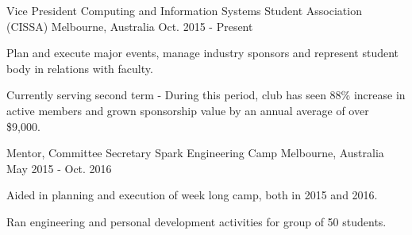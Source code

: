 \begin{cventries}
  \cventry
    {Vice President}
    {Computing and Information Systems Student Association (CISSA)}
    {Melbourne, Australia}
    {Oct. 2015 - Present}
    {
      \begin{cvitems}
        \item {Plan and execute major events, manage industry sponsors and represent student body in relations with faculty.}
        \item {Currently serving second term - During this period, club has seen 88\% increase in active members and grown sponsorship value by an annual average of over \$9,000.}
      \end{cvitems}
    }
    \cventry
    {Mentor, Committee Secretary}
    {Spark Engineering Camp}
    {Melbourne, Australia}
    {May 2015 - Oct. 2016}
    {
      \begin{cvitems}
        \item {Aided in planning and execution of week long camp, both in 2015 and 2016.}
        \item {Ran engineering and personal development activities for group of 50 students. }
      \end{cvitems}
    }
\end{cventries}
